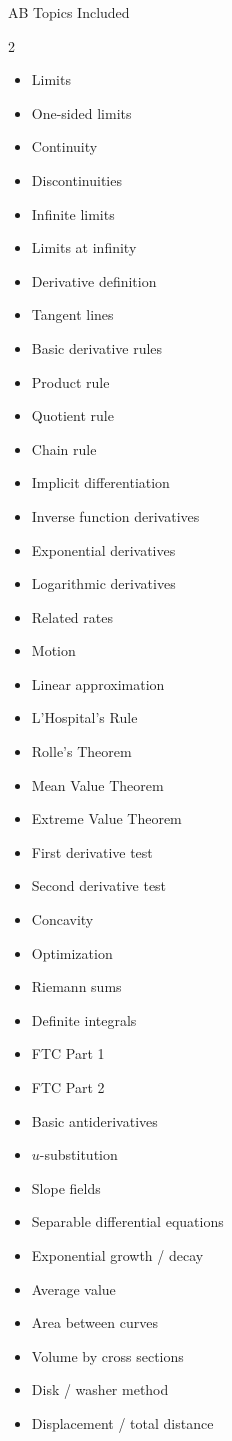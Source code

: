 \documentclass[11pt]{article}
\begin{document}
\begin{unitbox}{AB Topics Included}
\begin{multicols}{2}
\begin{itemize}[leftmargin=1.2em]
\item Limits
\item One-sided limits
\item Continuity
\item Discontinuities
\item Infinite limits
\item Limits at infinity
\item Derivative definition
\item Tangent lines
\item Basic derivative rules
\item Product rule
\item Quotient rule
\item Chain rule
\item Implicit differentiation
\item Inverse function derivatives
\item Exponential derivatives
\item Logarithmic derivatives
\item Related rates
\item Motion
\item Linear approximation
\item L'Hospital's Rule
\item Rolle's Theorem
\item Mean Value Theorem
\item Extreme Value Theorem
\item First derivative test
\item Second derivative test
\item Concavity
\item Optimization
\item Riemann sums
\item Definite integrals
\item FTC Part 1
\item FTC Part 2
\item Basic antiderivatives
\item \(u\)-substitution
\item Slope fields
\item Separable differential equations
\item Exponential growth / decay
\item Average value
\item Area between curves
\item Volume by cross sections
\item Disk / washer method
\item Displacement / total distance
\end{itemize}
\end{multicols}
\end{unitbox}
\end{document}
